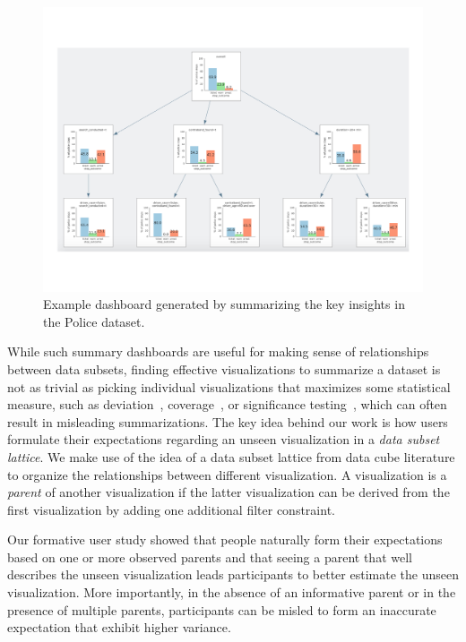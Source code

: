 \begin{figure}[h!]
\centering
\includegraphics[width=0.7\linewidth]{figures/storyboard.pdf}
\caption{Example dashboard generated by \sbd summarizing the key insights in the Police dataset.}
\label{fig:sbd}
\end{figure} 
\par While such summary dashboards are useful for making sense of relationships between data subsets, finding effective visualizations to summarize a dataset is not as trivial as picking individual visualizations that maximizes some statistical measure, such as deviation~\cite{Vartak2015}, coverage~\cite{Sarvghad2017}, or significance testing~\cite{Anand2015}, which can often result in misleading summarizations. The key idea behind our work is how users formulate their expectations regarding an unseen visualization in a \textit{data subset lattice}. We make use of the idea of a data subset lattice from data cube literature to organize the relationships between different visualization. A visualization is a \textit{parent} of another visualization if the latter visualization can be derived from the first visualization by adding one additional filter constraint. 
\par Our formative user study showed that people naturally form their expectations based on one or more observed parents and that seeing a parent that well describes the unseen visualization leads participants to better estimate the unseen visualization. More importantly, in the absence of an informative parent or in the presence of multiple parents, participants can be misled to form an inaccurate expectation that exhibit higher variance. 
